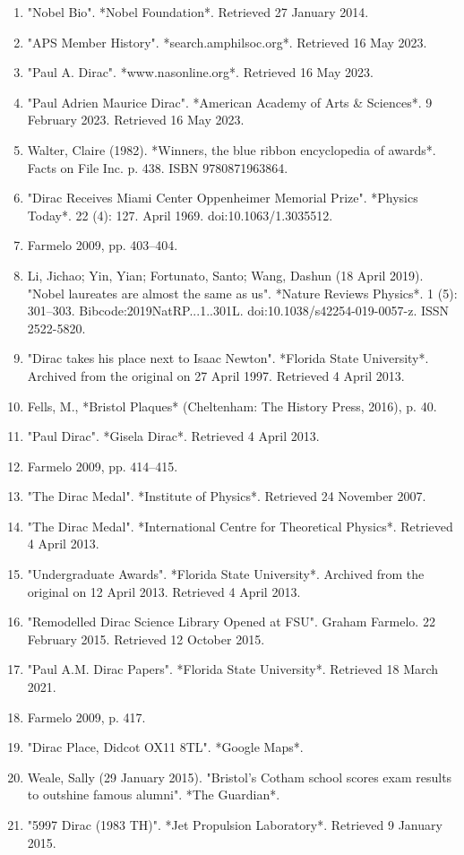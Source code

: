 \begin{enumerate}
\item "Nobel Bio". *Nobel Foundation*. Retrieved 27 January 2014.
\item "APS Member History". *search.amphilsoc.org*. Retrieved 16 May 2023.
\item "Paul A. Dirac". *www.nasonline.org*. Retrieved 16 May 2023.
\item "Paul Adrien Maurice Dirac". *American Academy of Arts & Sciences*. 9 February 2023. Retrieved 16 May 2023.
\item Walter, Claire (1982). *Winners, the blue ribbon encyclopedia of awards*. Facts on File Inc. p. 438. ISBN 9780871963864.
\item "Dirac Receives Miami Center Oppenheimer Memorial Prize". *Physics Today*. 22 (4): 127. April 1969. doi:10.1063/1.3035512.
\item Farmelo 2009, pp. 403–404.
\item Li, Jichao; Yin, Yian; Fortunato, Santo; Wang, Dashun (18 April 2019). "Nobel laureates are almost the same as us". *Nature Reviews Physics*. 1 (5): 301–303. Bibcode:2019NatRP...1..301L. doi:10.1038/s42254-019-0057-z. ISSN 2522-5820.
\item "Dirac takes his place next to Isaac Newton". *Florida State University*. Archived from the original on 27 April 1997. Retrieved 4 April 2013.
\item Fells, M., *Bristol Plaques* (Cheltenham: The History Press, 2016), p. 40.
\item "Paul Dirac". *Gisela Dirac*. Retrieved 4 April 2013.
\item Farmelo 2009, pp. 414–415.
\item "The Dirac Medal". *Institute of Physics*. Retrieved 24 November 2007.
\item "The Dirac Medal". *International Centre for Theoretical Physics*. Retrieved 4 April 2013.
\item "Undergraduate Awards". *Florida State University*. Archived from the original on 12 April 2013. Retrieved 4 April 2013.
\item "Remodelled Dirac Science Library Opened at FSU". Graham Farmelo. 22 February 2015. Retrieved 12 October 2015.
\item "Paul A.M. Dirac Papers". *Florida State University*. Retrieved 18 March 2021.
\item Farmelo 2009, p. 417.
\item "Dirac Place, Didcot OX11 8TL". *Google Maps*.
\item Weale, Sally (29 January 2015). "Bristol's Cotham school scores exam results to outshine famous alumni". *The Guardian*.
\item "5997 Dirac (1983 TH)". *Jet Propulsion Laboratory*. Retrieved 9 January 2015.
\end{enumerate}
